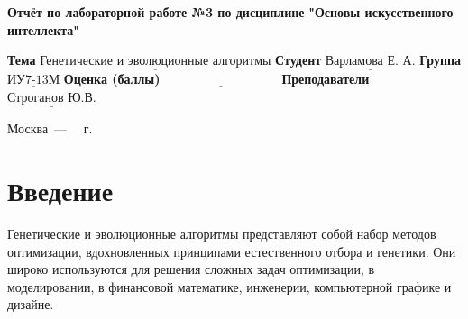 \documentclass[12pt]{report}
\begin{document}
\begin{titlepage}
	
	\begin{center}
		\noindent\begin{minipage}{1.3\textwidth}\centering
			\Large\textbf{  Отчёт по лабораторной работе №3 по дисциплине}\newline
			\textbf{ "Основы искусственного интеллекта"}\newline\newline
		\end{minipage}
	\end{center}
	
	\noindent\textbf{Тема} $\underline{\text{Генетические и эволюционные алгоритмы}}$\newline\newline
	\noindent\textbf{Студент} $\underline{\text{Варламова Е. А.}}$\newline\newline
	\noindent\textbf{Группа} $\underline{\text{ИУ7-13М}}$\newline\newline
	\noindent\textbf{Оценка (баллы)} $\underline{\text{~~~~~~~~~~~~~~~~~~~~~~~~~~~}}$\newline\newline
	\noindent\textbf{Преподаватели} $\underline{\text{Строганов Ю.В.}}$\newline\newline\newline
	
	\begin{center}
		\vfill
		Москва~---~\the\year
		~г.
	\end{center}
\end{titlepage}
\large
\setcounter{page}{2}
\def\contentsname{СОДЕРЖАНИЕ}
\renewcommand{\contentsname}{СОДЕРЖАНИЕ}
\tableofcontents
\renewcommand\labelitemi{---}
\newpage
\chapter*{Введение}

Генетические и эволюционные алгоритмы представляют собой набор методов оптимизации, вдохновленных принципами естественного отбора и генетики. Они широко используются для решения сложных задач оптимизации, в моделировании, в финансовой математике, инженерии, компьютерной графике и дизайне.
\end{document}
